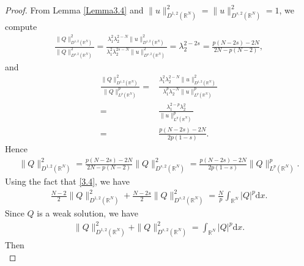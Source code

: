 \documentclass[12pt,a4paper,reqno]{amsart}
\numberwithin{equation}{section}
\begin{document}
\begin{proof}
From Lemma \ref{Lemma3.4} and $\|u\|_{D^{1,2}(\mathbb{R}^{N})}^{2}=\|u\|_{D^{s,2}(\mathbb{R}^{N})}^{2}=1$, we compute
\begin{equation*}
\begin{aligned}
\frac{
\|Q\|_{D^{1,2}(\mathbb{R}^{N})}^{2}
}
{\|Q\|_{D^{s,2}(\mathbb{R}^{N})}^{2}}
=
\frac{
\lambda_{1}^{2}\lambda_{2}^{2-N}
\|u\|_{D^{1,2}(\mathbb{R}^{N})}^{2}
}
{
\lambda_{1}^{2}\lambda_{2}^{2s-N}
\|u\|_{D^{s,2}(\mathbb{R}^{N})}^{2}}
=
\lambda_{2}^{2-2s}
=
\frac{p(N-2s)-2N}{2N-p(N-2)},
\end{aligned}
\end{equation*}
and
\begin{equation*}
\begin{aligned}
\frac{
\|Q\|_{D^{1,2}(\mathbb{R}^{N})}^{2}
}
{\|Q\|_{L^{p}(\mathbb{R}^{N})}^{p}}
=&
\frac{
\lambda_{1}^{2}\lambda_{2}^{2-N}
\|u\|_{D^{1,2}(\mathbb{R}^{N})}^{2}
}
{
\lambda_{1}^{p}\lambda_{2}^{-N}
\|u\|_{L^{p}(\mathbb{R}^{N})}^{p}}\\
=&
\frac{
\lambda_{1}^{2-p}\lambda_{2}^{2}
}
{\|u\|_{L^{p}(\mathbb{R}^{N})}^{p}}\\
=&
\frac{p(N-2s)-2N}{2p(1-s)}.
\end{aligned}
\end{equation*}
Hence
\begin{equation}\label{3.4}
\begin{aligned}
\|Q\|_{D^{1,2}(\mathbb{R}^{N})}^{2}
=
\frac{p(N-2s)-2N}{2N-p(N-2)}
\|Q\|_{D^{s,2}(\mathbb{R}^{N})}^{2}
=
\frac{p(N-2s)-2N}{2p(1-s)}
\|Q\|_{L^{p}(\mathbb{R}^{N})}^{p}.
\end{aligned}
\end{equation}
Using the fact that \eqref{3.4}, we have
\begin{equation*}\label{3.5}
\begin{aligned}
\frac{N-2}{2}
\|Q\|^{2}_{D^{1,2}(\mathbb{R}^{N})}
+
\frac{N-2s}{2}
\|Q\|^{2}_{D^{s,2}(\mathbb{R}^{N})}
=\frac{N}{p}\int_{\mathbb{R}^{N}}|Q|^{p}\mathrm{d}x.
\end{aligned}
\end{equation*}
Since $Q$ is a weak solution, we have
\begin{equation*}
\begin{aligned}
\|Q\|^{2}_{D^{1,2}(\mathbb{R}^{N})}
+
\|Q\|^{2}_{D^{s,2}(\mathbb{R}^{N})}
=\int_{\mathbb{R}^{N}}|Q|^{p}\mathrm{d}x.
\end{aligned}
\end{equation*}
Then
\begin{equation*}

\end{equation*}
\end{proof}
\end{document}
